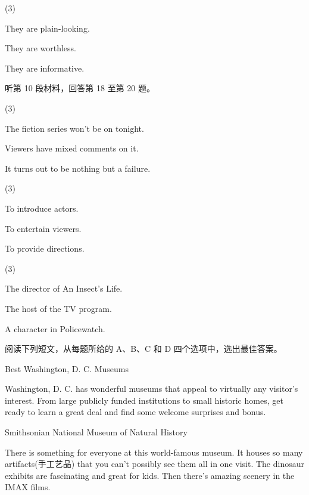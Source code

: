\documentclass{英语试卷}
\begin{document}
\begin{choices}(3)
  \item They are plain-looking.
  \item They are worthless.
  \item They are informative.
\end{choices}
\par 听第 10 段材料，回答第 18 至第 20 题。\par
{}
\begin{choices}(3)
  \item The fiction series won't be on tonight.
  \item Viewers have mixed comments on it.
  \item It turns out to be nothing but a failure.
\end{choices}
\begin{choices}(3)
  \item To introduce actors.
  \item To entertain viewers.
  \item To provide directions.
\end{choices}
\begin{choices}(3)
  \item The director of An Insect's Life.
  \item The host of the TV program.
  \item A character in Policewatch.
\end{choices}
\par 阅读下列短文，从每题所给的 A、B、C 和 D 四个选项中，选出最佳答案。\par
{}
\par Best Washington, D. C. Museums\par
\par Washington, D. C. has wonderful museums that appeal to virtually any visitor's interest. From large publicly funded institutions to small historic homes, get ready to learn a great deal and find some welcome surprises and bonus.\par
\par Smithsonian National Museum of Natural History\par
\par There is something for everyone at this world-famous museum. It houses so many artifacts(手工艺品) that you can't possibly see them all in one visit. The dinosaur exhibits are fascinating and great for kids. Then there's amazing scenery in the IMAX films.\par
\end{document}
